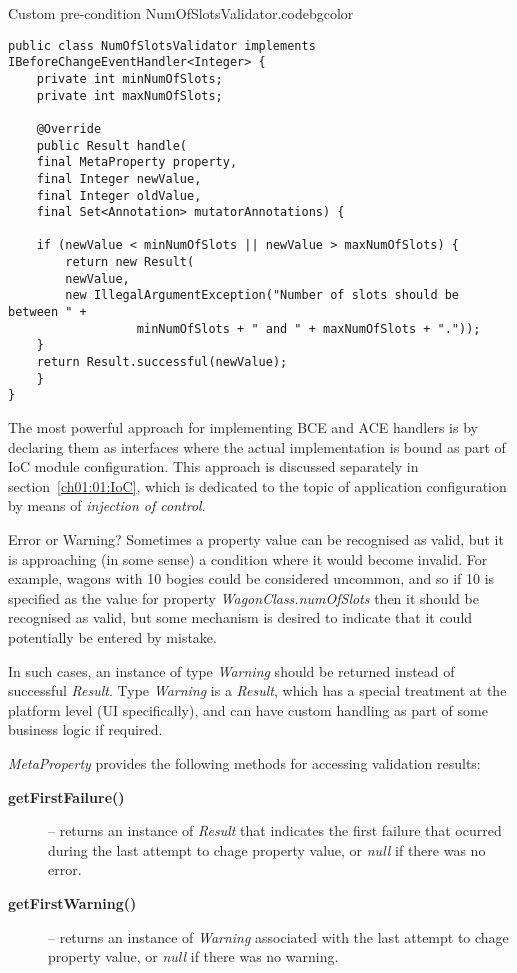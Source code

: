   \begin{code}{Custom pre-condition NumOfSlotsValidator.}{\label{lst:NumOfSlotsValidator}}{codebgcolor}
    \begin{lstlisting}
public class NumOfSlotsValidator implements IBeforeChangeEventHandler<Integer> {
    private int minNumOfSlots;
    private int maxNumOfSlots;

    @Override
    public Result handle(
	final MetaProperty property, 
	final Integer newValue, 
	final Integer oldValue, 	
	final Set<Annotation> mutatorAnnotations) {

	if (newValue < minNumOfSlots || newValue > maxNumOfSlots) {
	    return new Result(
		newValue, 
		new IllegalArgumentException("Number of slots should be between " + 
				  minNumOfSlots + " and " + maxNumOfSlots + "."));
	}
	return Result.successful(newValue);
    }
}
    \end{lstlisting}
  \end{code}

  The most powerful approach for implementing BCE and ACE handlers is by declaring them as interfaces where the actual implementation is bound as part of IoC module configuration.
  This approach is discussed separately in section~\ref{ch01:01:IoC}, which is dedicated to the topic of application configuration by means of \emph{injection of control}.

  \begin{notebox}{Error or Warning?}{\label{nb:ErrorOrWarning}}    
    Sometimes a property value can be recognised as valid, but it is approaching (in some sense) a condition where it would become invalid.
    For example, wagons with 10 bogies could be considered uncommon, and so if 10 is specified as the value for property \emph{WagonClass.numOfSlots} then it should be recognised as valid, but some mechanism is desired to indicate that it could potentially be entered by mistake.

    In such cases, an instance of type \emph{Warning} should be returned instead of successful \emph{Result}.
    Type \emph{Warning} is a \emph{Result}, which has a special treatment at the platform level (UI specifically), and can have custom handling as part of some business logic if required.
  \end{notebox}

  \emph{MetaProperty} provides the following methods for accessing validation results:
  \begin{description}
    \item[\textbf{getFirstFailure()}] -- returns an instance of \emph{Result} that indicates the first failure that ocurred during the last attempt to chage  property value, or \emph{null} if there was no error.
    \item[\textbf{getFirstWarning()}] --  returns an instance of \emph{Warning} associated with the last attempt to chage  property value, or \emph{null} if there was no warning.
  \end{description}


